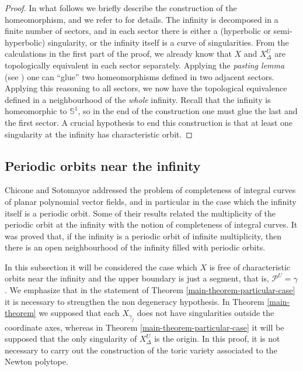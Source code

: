 \documentclass[12pt]{amsart}
\begin{document}
\begin{proof}
In what follows we briefly describe the construction of the homeomorphism, and we refer to \cite[Theorem B]{Dumortier77} for details. The infinity is decomposed in a finite number of sectors, and in each sector there is either a (hyperbolic or semi-hyperbolic) singularity, or the infinity itself is a curve of singularities. From the calculations in the first part of the proof, we already know that $X$ and $X_{\Delta}^{U}$ are topologically equivalent in each sector separately. Applying the \emph{pasting lemma} (see \cite[Lemma 5.7]{Dumortier77}) one can ``glue'' two homeomorphisms defined in two adjacent sectors. Applying this reasoning to all sectors, we now have the topological equivalence defined in a neighbourhood of the \emph{whole} infinity. Recall that the infinity is homeomorphic to $\mathbb{S}^{1}$, so in the end of the construction one must glue the last and the first sector. A crucial hypothesis to end this construction is that at least one singularity at the infinity has characteristic orbit. \end{proof}

\subsection{Periodic orbits near the infinity}\label{subsec-periodic-orbits}

Chicone and Sotomayor \cite{ChiconeSoto} addressed the problem of completeness of integral curves of planar polynomial vector fields, and in particular in the case which the infinity itself is a periodic orbit. Some of their results related the multiplicity of the periodic orbit at the infinity with the notion of completeness of integral curves. It was proved that, if the infinity is a periodic orbit of infinite multiplicity, then there is an open neighbourhood of the infinity filled with periodic orbits.

In this subsection it will be considered the case which $X$ is free of characteristic orbits near the infinity and the upper boundary is just a segment, that is, $\mathcal{P}^{U} = \gamma$. We emphasize that in the statement of Theorem \ref{main-theorem-particular-case} it is necessary to strengthen the non degeneracy hypothesis. In Theorem \ref{main-theorem} we supposed that each $X_{\gamma_{j}}$ does not have singularities outside the coordinate axes, whereas in Theorem \ref{main-theorem-particular-case} it will be supposed that the only singularity of $X^{U}_{\Delta}$ is the origin. In this proof, it is not necessary to carry out the construction of the toric variety associated to the Newton polytope.
\end{document}
